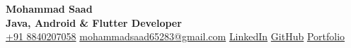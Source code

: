 \begin{center}
  {\fontsize{24}{27}\selectfont\bfseries Mohammad Saad}\\[3pt]
  {\normalsize\color{accent}\textbf{Java, Android \& Flutter Developer}}\\[5pt]
  {\small
    \href{tel:+918840207058}{+91 8840207058}\quad\textbar\quad
    \href{mailto:mohammadsaad65283@gmail.com}{mohammadsaad65283@gmail.com}\quad\textbar\quad
    \href{https://www.linkedin.com/in/mohammad-saad-0b7b5b32a/}{LinkedIn}\quad\textbar\quad
    \href{http://github.com/sonicSAAD}{GitHub}\quad\textbar\quad
    \href{https://sonicsaad.github.io/}{Portfolio}
  }
\end{center}
